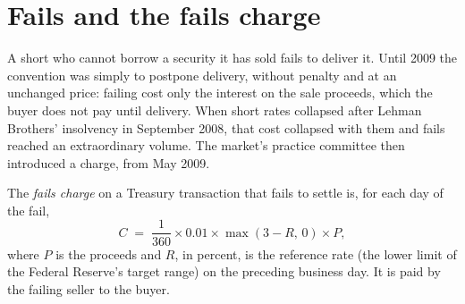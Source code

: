 \begin{omfigure}

\label{fig:m2:repo-and-specials:special}
\end{omfigure}

\section{Fails and the fails charge}

A short who cannot borrow a security it has sold fails to deliver it. Until
2009 the convention was simply to postpone delivery, without penalty and at
an unchanged price: failing cost only the interest on the sale proceeds, which
the buyer does not pay until delivery. When short rates collapsed after
Lehman Brothers' insolvency in September 2008, that cost collapsed with them
and fails reached an extraordinary volume. The market's practice committee
then introduced a charge, from May 2009.

\begin{definition}\label{def:m2:repo-and-specials:fails}
The \emph{fails charge} on a Treasury transaction that
fails to settle is, for each day of the fail,
\[
C \;=\; \frac{1}{360}\times 0.01 \times \max(3 - R,\,0) \times P,
\]
where $P$ is the proceeds and $R$, in percent, is the reference rate (the lower
limit of the Federal Reserve's target range) on the preceding business day. It
is paid by the failing seller to the buyer.
\end{definition}

